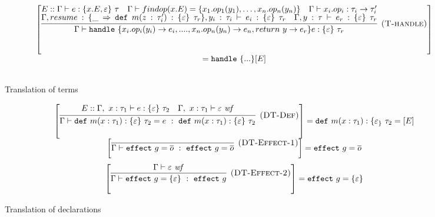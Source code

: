 \documentclass{article}
\theoremstyle{definition}
\newcommand{\keywadj}[1]{\mathtt{#1}}
\newcommand{\keyw}[1]{\keywadj{#1}~}
\begin{document}
\begin{figure}[H]
{\[\begin{array}{cc}
\left[  \infer[\textsc{(T-handle)}]
  {\Gamma \vdash \keyw{handle} \{x_i.op_i(y_i)\rightarrow e_i, ...., x_n.op_n(y_n)\rightarrow e_n, return\ y\rightarrow e_r\} e: \{\varepsilon\}\ \tau_r }
  {E::\Gamma \vdash e: \{x.E, \varepsilon\}\ \tau \quad 
  \Gamma \vdash findop(x.E) = \{ x_1.op_1(y_1), \dots, x_n.op_n(y_n)\} \quad
   \Gamma \vdash x_i.op_i : \tau_i \rightarrow \tau_i'\\  
   \Gamma, resume: \{\_ \Rightarrow \keyw{def} m(z: \tau_i') : \{\varepsilon\}\ \tau_r\} , y_i:\tau_i \vdash e_i: \{\varepsilon\}\ \tau_r \quad \Gamma, y:\tau \vdash e_r: \{\varepsilon\}\ \tau_r
  }\right] \\= \keyw{handle}\{...\}[E]\\[3ex]
\end{array}
\]
}


\caption{Translation of terms}
\label{f-declarative}
\end{figure}

\begin{figure}[H]
\flushleft
\footnotesize{
\[
  \begin{array}{cc}
  
 \left[
\infer[\textsc{(DT-Def)}]
  {\Gamma \vdash \keyw{def} m(x : \tau_1) : \{ \varepsilon \}~\tau_2 = e~:~\keyw{def} m(x : \tau_1) : \{ \varepsilon \}~\tau_2}
  {\begin{gathered} E :: \Gamma,~x : \tau_1 \vdash e : \{ \varepsilon \}~\tau_2\quad\Gamma,~x : \tau_1 \vdash \varepsilon~\mathit{wf} \end{gathered}} 
  \right] = \keyw{def} m(x : \tau_1) : \{ \varepsilon_\}~\tau_2 = [E]
  \\[3ex]


\left[
\infer[\textsc{(DT-Effect-1)}]
  {\Gamma \vdash \keyw{effect} g = \overline{o} ~:~\keyw{effect} g = \overline{o}}
  {}
  
  \right] = \keyw{effect} g = \overline{o}
\\[3ex]


\left[
\infer[\textsc{(DT-Effect-2)}]
  {\Gamma \vdash \keyw{effect} g = \{ \varepsilon \}~:~\keyw{effect} g }
  {\Gamma \vdash \varepsilon~\mathit{wf}}
  
  \right] = \keyw{effect} g = \{ \varepsilon \}
\\[3ex]
\end{array}
\]



}
\caption{Translation of declarations}
\label{f-effects-subtyping-rules}
\end{figure}
\end{document}
